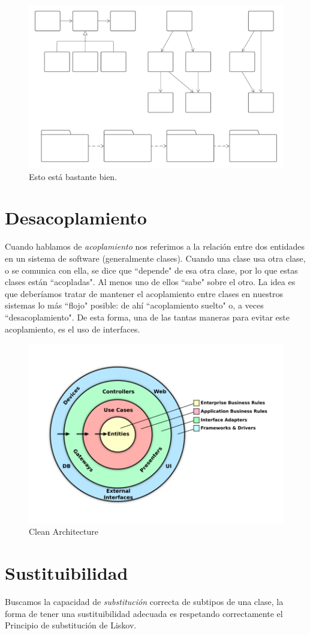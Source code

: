 \documentclass[a4paper,11pt]{article}
\begin{document}
\begin{figure}[!h]
    \centering
    \includegraphics[scale=.5]{assets/gc1.png}
    \caption{Esto está bastante bien.}
\end{figure}

\section{Desacoplamiento}
Cuando hablamos de \emph{acoplamiento} nos referimos a la relación entre dos 
entidades en un sistema de software (generalmente clases).  Cuando una clase 
usa otra clase, o se comunica con ella, se dice que ``depende" de esa otra 
clase, por lo que estas clases están ``acopladas". Al menos uno de ellos 
``sabe" sobre el otro. La idea es que deberíamos tratar de mantener el 
acoplamiento entre clases en nuestros sistemas lo más ``flojo" posible: de ahí 
``acoplamiento suelto" o, a veces ``desacoplamiento". De esta forma, una de las 
tantas maneras para evitar este acoplamiento, es el uso de interfaces.

\begin{figure}[!h]
    \centering
    \includegraphics[scale=.3]{assets/architecture.png}
    \caption{Clean Architecture}
\end{figure}

\section{Sustituibilidad}
Buscamos la capacidad de \emph{substitución} correcta de subtipos de una clase, 
la forma de tener una sustituibilidad adecuada es respetando correctamente el 
Principio de substitución de Liskov.

{}

\end{document}
